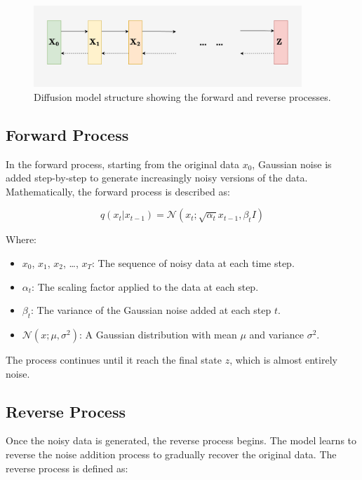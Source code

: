 \begin{figure}[H]
    \centering
    \includegraphics[width=0.9\textwidth]{./Images/Diffusion_structure.jpg}
    \caption{Diffusion model structure showing the forward and reverse processes.}
    \label{fig:Diffusion_structure}
\end{figure}

\subsection{Forward Process}
In the forward process, starting from the original data \(x_0\), Gaussian noise is added step-by-step to generate increasingly noisy versions of the data. Mathematically, the forward process is described as:

\begin{equation}
q(x_t | x_{t-1}) = \mathcal{N}(x_t; \sqrt{\alpha_t} x_{t-1}, \beta_t I)
\end{equation}

Where:
\begin{itemize}
    \item \(x_0\), \(x_1\), \(x_2\), \dots, \(x_T\): The sequence of noisy data at each time step.
    \item \(\alpha_t\): The scaling factor applied to the data at each step.
    \item \(\beta_t\): The variance of the Gaussian noise added at each step \(t\).
    \item \(\mathcal{N}(x; \mu, \sigma^2)\): A Gaussian distribution with mean \(\mu\) and variance \(\sigma^2\).
\end{itemize}

The process continues until it reach the final state \(z\), which is almost entirely noise.

\subsection{Reverse Process}
Once the noisy data is generated, the reverse process begins. The model learns to reverse the noise addition process to gradually recover the original data. The reverse process is defined as:

